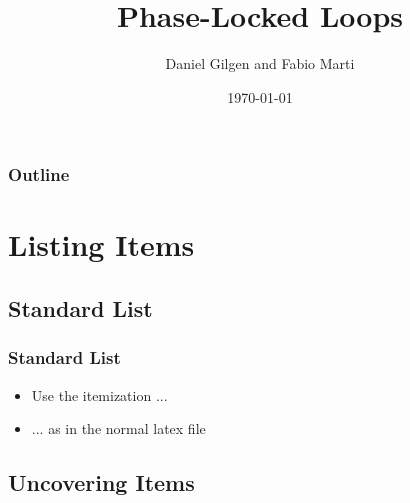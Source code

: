 \documentclass{beamer}
\title[Phase-Locked Loops] %
{Phase-Locked Loops}
\author{Daniel Gilgen and Fabio Marti}
\institute{ETH Zurich\\
\vspace{0.5 cm}
dagilgen@ethz.ch \hspace{1 cm} martif@ethz.ch %
\vspace{1.4 cm}


}
\date{\today}
\newcommand{\subsectitle}{}
\newcommand{\subsectiontitle}[1]{\renewcommand{\subsectitle}{#1}}
\begin{document}
\begin{frame}[plain]
  \titlepage
\centering
\end{frame}

\begin{frame}
\frametitle{Outline}
\tableofcontents
\end{frame}

\section{Listing Items} %


\subsectiontitle{Standard List} %

\subsection{\subsectitle}

\begin{frame}
  
  \frametitle{\subsectitle}

\begin{itemize}
\item Use the itemization ...
\item ... as in the normal latex file
\end{itemize}

\end{frame}


\subsectiontitle{Uncovering Items} %

\subsection{\subsectitle}
\end{document}
